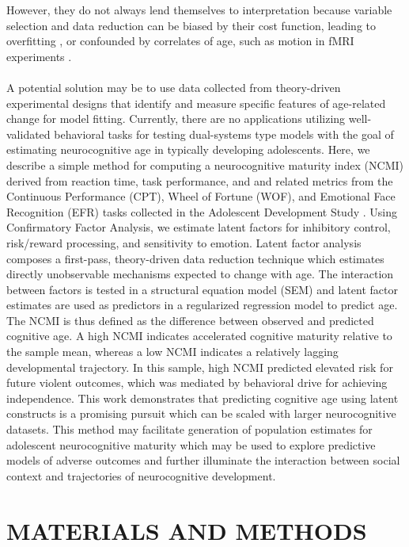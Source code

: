 \documentclass[utf8]{frontiersSCNS} %
\begin{document}
However, they do not always lend themselves to interpretation because variable selection and data reduction can be biased by their cost function, leading to overfitting \citep{babyak2004you}, or confounded by correlates of age, such as motion in fMRI experiments \citep{satterthwaite2013heterogeneous}. \paragraph*{} A potential solution may be to use data collected from theory-driven experimental designs that identify and measure specific features of age-related change for model fitting. Currently, there are no applications utilizing well-validated behavioral tasks for testing dual-systems type models with the goal of estimating neurocognitive age in typically developing adolescents. Here, we describe a simple method for computing a neurocognitive maturity index (NCMI) derived from reaction time, task performance, and and related metrics from the Continuous Performance (CPT), Wheel of Fortune (WOF), and Emotional Face Recognition (EFR) tasks collected in the Adolescent Development Study \citep{Fishbein2016}. Using Confirmatory Factor Analysis, we estimate latent factors for inhibitory control, risk/reward processing, and sensitivity to emotion. Latent factor analysis composes a first-pass, theory-driven data reduction technique which estimates directly unobservable mechanisms expected to change with age. The interaction between factors is tested in a structural equation model (SEM) and latent factor estimates are used as predictors in a regularized regression model to predict age. The NCMI is thus defined as the difference between observed and predicted cognitive age. A high NCMI indicates accelerated cognitive maturity relative to the sample mean, whereas a low NCMI indicates a relatively lagging developmental trajectory. In this sample, high NCMI predicted elevated risk for future violent outcomes, which was mediated by behavioral drive for achieving independence. This work demonstrates that predicting cognitive age using latent constructs is a promising pursuit which can be scaled with larger neurocognitive datasets. This method may facilitate generation of population estimates for adolescent neurocognitive maturity which may be used to explore predictive models of adverse outcomes and further illuminate the interaction between social context and trajectories of neurocognitive development. 
\section{MATERIALS AND METHODS}
\end{document}
